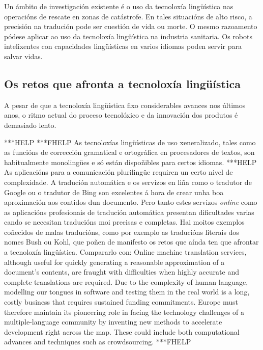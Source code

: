 \begin{multicols}{2}
Un ámbito de investigación existente é o uso da tecnoloxía lingüística nas operacións de rescate en zonas de catástrofe. En tales situacións de alto risco, a precisión na tradución pode ser cuestión de vida ou morte. O mesmo razoamento pódese aplicar ao uso da tecnoloxía lingüística na industria sanitaria. Os robots intelixentes con capacidades lingüísticas en varios idiomas poden servir para salvar vidas. 

\subsection{Os retos que afronta a tecnoloxía lingüística}

   A pesar de que a tecnoloxía lingüística fixo considerables avances nos últimos anos, o ritmo actual do proceso tecnolóxico e da innovación dos produtos é demasiado lento.

 ***HELP ***FHELP
 As tecnoloxías lingüísticas de uso xeneralizado, tales como as funcións de corrección gramatical e ortográfica en procesadores de textos, son habitualmente monolingües e só están dispoñibles para certos idiomas. ***HELP As aplicacións para a comunicación plurilingüe requiren un certo nivel de complexidade. A tradución automática e os servizos en liña como o tradutor de Google ou o tradutor de Bing son excelentes á hora de crear unha boa aproximación aos contidos dun documento. Pero tanto estes servizos \textit{online} como as aplicacións profesionais de tradución automática presentan dificultades varias cando se necesitan traducións moi precisas e completas. Hai moitos exemplos coñecidos de malas traducións, como por exemplo as traducións literais dos nomes Bush ou Kohl, que poñen de manifesto os retos que aínda ten que afrontar a tecnoloxía lingüística.
Compararlo con:
Online machine translation services, although useful for quickly generating a reasonable approximation of a document’s contents, are fraught with difficulties when highly accurate and complete translations are required. Due to the complexity of human language, modelling our tongues in software and testing them in the real world is a long, costly business that requires sustained funding commitments. Europe must therefore maintain its pioneering role in facing the technology challenges of a multiple-language community by inventing new methods to accelerate development right across the map. These could include both computational advances and techniques such as crowdsourcing.
***FHELP
 

\end{multicols}

